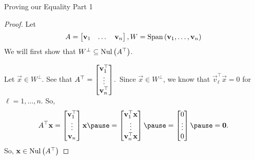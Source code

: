 \documentclass[xcoler=dvipsnames, aspectratio=169]{beamer}
\begin{document}
    \begin{frame}{Proving our Equality Part 1}
        \small
        \begin{proof}
        Let 
            \[
                A = \begin{bmatrix}
                    \mathbf{v}_1 & \dots & \mathbf{v}_n
                \end{bmatrix}, W = \text{Span}\left(\mathbf{v}_1,\dots,\mathbf{v}_n\right)
            \]\pause
            We will first show that $W^\perp\subseteq\mathrm{Nul}\left(A^\top\right)$.\pause

            Let $\vec{x}\in W^\perp$. See that $A^\top = \begin{bmatrix}
                    \mathbf{v}_1^\top \\ \vdots \\ \mathbf{v}_n^\top
                \end{bmatrix}$.\pause\ Since $\vec{x}\in W^\perp$, we know that $\vec{v}_\ell^\top\vec{x}=0$ for 
                $\ell=1,\dots,n$. So,\pause
                \[
                    A^\top\vec{x} = \bMat{
                        \vec{v}_1^\top \\
                        \vdots \\
                        \vec{v}_n
                    }\vec{x}\pause = \bMat{
                        \vec{v}_1^\top\vec{x} \\
                        \vdots \\
                        \vec{v}_n^\top\vec{x}
                    }\pause = \bMat{0\\\vdots\\0}\pause = \vec{0}.
                \]
                So, $\mathbf{x}\in\mathrm{Nul}\left(A^\top\right)$
        \end{proof}
    \end{frame}
\end{document}
